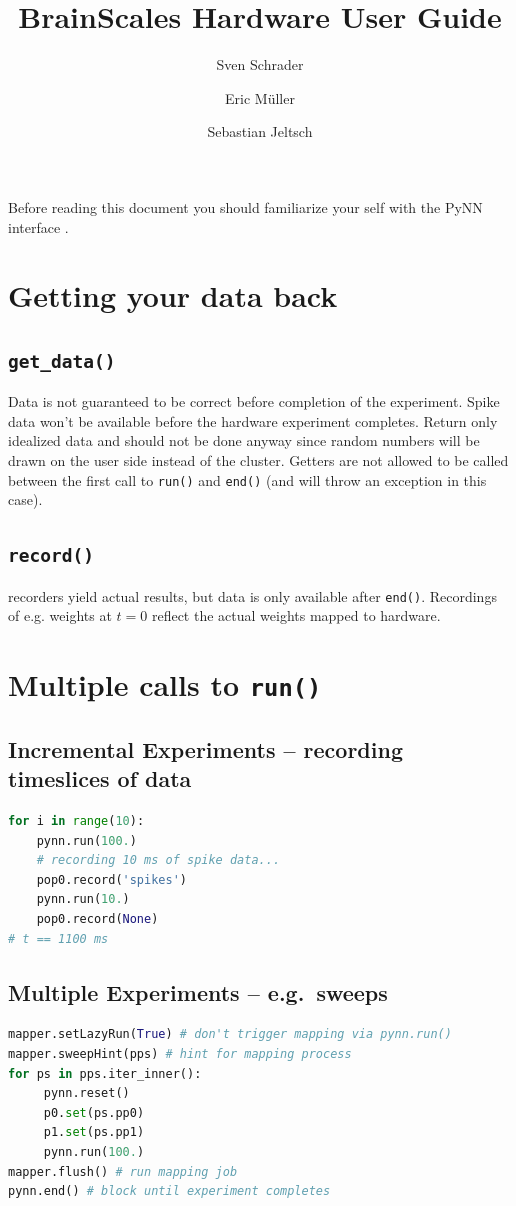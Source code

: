 \documentclass[11pt, a4paper, DIV=11]{scrartcl}
\author{Sven Schrader \and Eric M\"uller \and Sebastian Jeltsch}
\title{BrainScales Hardware User Guide}
\begin{document}
\maketitle

Before reading this document you should familiarize your self with the
\acs{PyNN} interface \cite{pynn}.

\section{Getting your data back}
\subsection{\texttt{get\_data()}}
Data is not guaranteed to be correct before completion of the experiment.
Spike data won't be available before the hardware experiment completes. %
Return only idealized data and should not be done anyway since random numbers
will be drawn on the user side instead of the cluster.
Getters are not allowed to be called between the first call to
\texttt{run()} and \texttt{end()} (and will throw an exception in this case).

\subsection{\texttt{record()}}
recorders yield actual results, but data is only available after
\texttt{end()}. Recordings of e.g. weights at $t=0$ reflect the actual weights
mapped to hardware.


\section{Multiple calls to \texttt{run()}}

\subsection{Incremental Experiments -- recording timeslices of data}
\begin{lstlisting}[language=Python]
for i in range(10):
    pynn.run(100.)
    # recording 10 ms of spike data...
    pop0.record('spikes')
    pynn.run(10.)
    pop0.record(None)
# t == 1100 ms
\end{lstlisting}

\subsection{Multiple Experiments -- e.g.\ sweeps}
\begin{lstlisting}[language=Python]
mapper.setLazyRun(True) # don't trigger mapping via pynn.run()
mapper.sweepHint(pps) # hint for mapping process
for ps in pps.iter_inner():
     pynn.reset()
     p0.set(ps.pp0)
     p1.set(ps.pp1)
     pynn.run(100.)
mapper.flush() # run mapping job
pynn.end() # block until experiment completes
 \end{lstlisting}
\end{document}
